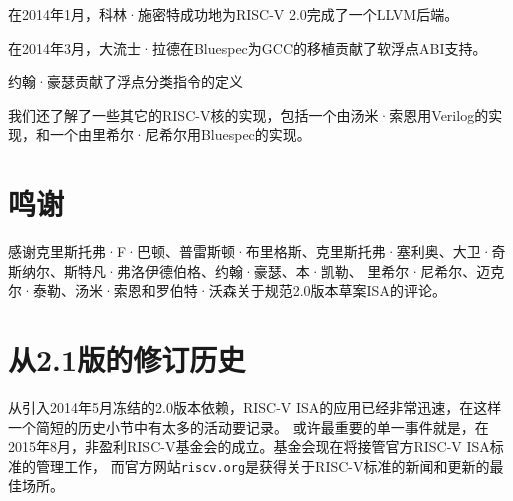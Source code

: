 在2014年1月，科林·施密特成功地为RISC-V 2.0完成了一个LLVM后端。

在2014年3月，大流士·拉德在Bluespec为GCC的移植贡献了软浮点ABI支持。

约翰·豪瑟贡献了浮点分类指令的定义

我们还了解了一些其它的RISC-V核的实现，包括一个由汤米·索恩用Verilog的实现，和一个由里希尔·尼希尔用Bluespec的实现。

\section*{鸣谢}

感谢克里斯托弗·F·巴顿、普雷斯顿·布里格斯、克里斯托弗·塞利奥、大卫·奇斯纳尔、斯特凡·弗洛伊德伯格、约翰·豪瑟、本·凯勒、
里希尔·尼希尔、迈克尔·泰勒、汤米·索恩和罗伯特·沃森关于规范2.0版本草案ISA的评论。

\section{从2.1版的修订历史}

从引入2014年5月冻结的2.0版本依赖，RISC-V ISA的应用已经非常迅速，在这样一个简短的历史小节中有太多的活动要记录。
或许最重要的单一事件就是，在2015年8月，非盈利RISC-V基金会的成立。基金会现在将接管官方RISC-V ISA标准的管理工作，
而官方网站{\tt riscv.org}是获得关于RISC-V标准的新闻和更新的最佳场所。

